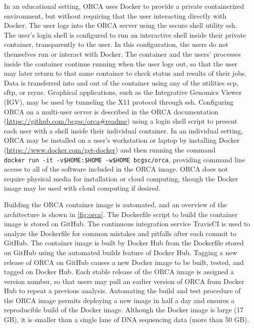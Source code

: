 \documentclass[
  12pt,
  oneside,
  openany]{book}
\begin{document}
In an educational setting, ORCA uses Docker to provide a private containerized environment, but without requiring that the user interacting directly with Docker. The user logs into the ORCA server using the secure shell utility ssh. The user's login shell is configured to run an interactive shell inside their private container, transparently to the user. In this configuration, the users do not themselves run or interact with Docker. The container and the users' processes inside the container continue running when the user logs out, so that the user may later return to that same container to check status and results of their jobs. Data is transferred into and out of the container using any of the utilities scp, sftp, or rsync. Graphical applications, such as the Integrative Genomics Viewer (IGV), may be used by tunneling the X11 protocol through ssh. Configuring ORCA on a multi-user server is described in the ORCA documentation (\url{https://github.com/bcgsc/orca\#readme}) using a login shell script to present each user with a shell inside their individual container. In an individual setting, ORCA may be installed on a user's workstation or laptop by installing Docker (\url{https://www.docker.com/get-docker}) and then running the command \texttt{docker\ run\ -it\ -v\$HOME:\$HOME\ -w\$HOME\ bcgsc/orca}, providing command line access to all of the software included in the ORCA image. ORCA does not require physical media for installation or cloud computing, though the Docker image may be used with cloud computing if desired.

Building the ORCA container image is automated, and an overview of the architecture is shown in \cref{fig:orca}. The Dockerfile script to build the container image is stored on GitHub. The continuous integration service TravisCI is used to analyze the Dockerfile for common mistakes and pitfalls after each commit to GitHub. The container image is built by Docker Hub from the Dockerfile stored on GitHub using the automated builds feature of Docker Hub. Tagging a new release of ORCA on GitHub causes a new Docker image to be built, tested, and tagged on Docker Hub. Each stable release of the ORCA image is assigned a version number, so that users may pull an earlier version of ORCA from Docker Hub to repeat a previous analysis. Automating the build and test procedure of the ORCA image permits deploying a new image in half a day and ensures a reproducible build of the Docker image. Although the Docker image is large (17 GB), it is smaller than a single lane of DNA sequencing data (more than 50 GB).
\end{document}
